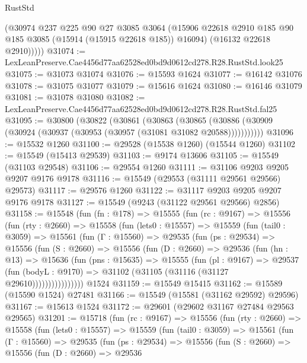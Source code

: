 \begin{lexlean}{RustStd}
\begin{coremodule}
          (@30974
            @237
            @225
            @90
            @27
            @3085
            @3064
            (@15906 @22618 @2910 @185 @90 @185 @3085 (@15914 (@15915 @22618 @185)) @16094)
            (@16132 @22618 @2910)))))
@31074 := LexLeanPreserve.Cae4456d77aa62528ed0bd9d0612cd278.R28.RustStd.look25
@31075 := @31073 @31074
@31076 := @15593 @1624
@31077 := @16142 @31076
@31078 := @31075 @31077
@31079 := @15616 @1624
@31080 := @16146 @31079
@31081 := @31078 @31080
@31082 := LexLeanPreserve.Cae4456d77aa62528ed0bd9d0612cd278.R28.RustStd.fal25
@31095 := @30800
    (@30822
      (@30861
        (@30863
          (@30865 (@30886 (@30909 (@30924 (@30937 (@30953 (@30957 (@31081 @31082 @20588)))))))))))
@31096 := @15532 @1260
@31100 := @29528 (@15538 @1260) (@15544 @1260)
@31102 := @15549 (@15413 @29539)
@31103 := @9174 @13606
@31105 := @15549 (@31103 @29548)
@31106 := @29554 @1260
@31111 := @31106 @9203 @9205 @9207 @9176 @9178
@31116 := @15549 (@29553 (@31111 @29561 @29566) @29573)
@31117 := @29576 @1260
@31122 := @31117 @9203 @9205 @9207 @9176 @9178
@31127 := @15549 (@9243 (@31122 @29561 @29566) @2856)
@31158 := @15548
    (fun (fn : @178) =>
    @15555
      (fun (rc : @9167) =>
      @15556
        (fun (rty : @2660) =>
        @15558
          (fun (lets0 : @15557) =>
          @15559
            (fun (tail0 : @3059) =>
            @15561
              (fun (Γ : @15560) =>
              @29535
                (fun (ps : @29534) =>
                @15556
                  (fun (S : @2660) =>
                  @15556
                    (fun (D : @2660) =>
                    @29536
                      (fun (hn : @13) =>
                      @15636
                        (fun (pns : @15635) =>
                        @15555
                          (fun (pl : @9167) =>
                          @29537
                            (fun (bodyL : @9170) =>
                            @31102 (@31105 (@31116 (@31127 @29610))))))))))))))))
    @1524
@31159 := @15549 @15415
@31162 := @15589 (@15590 @1524) @27481
@31166 := @15549 (@15581 (@31162 @29592) @29596)
@31167 := @15613 @1524
@31172 := @29601 (@29602 @31167 @27484 @29563 @29565)
@31201 := @15718
    (fun (rc : @9167) =>
    @15556
      (fun (rty : @2660) =>
      @15558
        (fun (lets0 : @15557) =>
        @15559
          (fun (tail0 : @3059) =>
          @15561
            (fun (Γ : @15560) =>
            @29535
              (fun (ps : @29534) =>
              @15556
                (fun (S : @2660) =>
                @15556
                  (fun (D : @2660) =>
                  @29536

\end{coremodule}
\end{lexlean}

